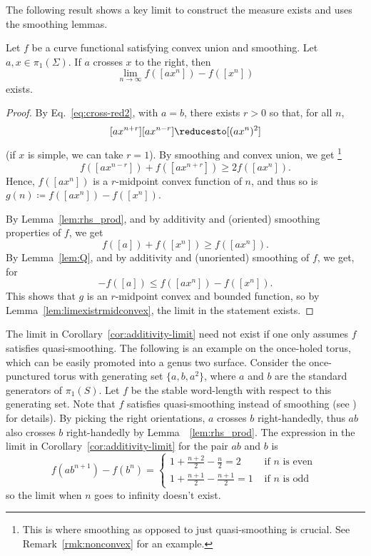 

The following result shows a key limit to construct the measure exists and uses the smoothing lemmas.

\begin{corollary}\label{cor:additivity-limit}
Let $f$ be a curve functional satisfying convex union and smoothing. Let $a,x \in \pi_1(\Sigma)$.
  If $a$ crosses $x$ to the right, then
  \[
    \lim_{n \to \infty} f([a x^n]) - f([x^n])
  \]
  exists.
\end{corollary}

\begin{proof}
  By Eq.~\eqref{eq:cross-red2}, with $a=b$, there exists $r>0$ so that, for all $n$,
  \[
     [ax^{n+r}] [ax^{n-r}] \reducesto [(ax^n)^2]
  \]
  (if $x$ is simple, we can take $r=1$).
  By smoothing and convex union, we get%
  \footnote{This is where smoothing as opposed to just
    quasi-smoothing is crucial. See Remark~\ref{rmk:nonconvex} for an example.}
  \[
  f([ax^{n-r}]) + f([ax^{n+r}]) \geq 2 f([ax^n]).
  \]
  Hence, $f([a x^n])$ is a $r$-midpoint convex function
  of $n$, and thus so is $g(n) \coloneqq f([a x^n]) - f([x^n])$.
 
 By Lemma~\ref{lem:rhs_prod}, and by additivity and (oriented)
 smoothing properties of $f$, we get
 \[
 f([a]) + f([x^{n}]) \geq f([ax^{n}]).
 \]
By Lemma~\ref{lem:Q}, and by additivity and (unoriented) smoothing of $f$, we get, for
  \[
    -f([a]) \le f([a x^n]) - f([x^n]).
  \]
  This shows that $g$ is an $r$-midpoint convex and bounded function, so by Lemma~\ref{lem:limexistrmidconvex}, the limit in the statement exists.
\end{proof}

\begin{remark}
The limit in Corollary~\ref{cor:additivity-limit} need not exist if one only assumes $f$ satisfies quasi-smoothing.
The following is an example on the once-holed torus, which can be easily promoted into a genus two surface.
Consider the once-punctured torus with generating set $\{a,b,a^2\}$, where $a$ and $b$ are the standard generators of $\pi_1(S)$.
Let $f$ be the stable word-length with respect to this generating set. Note that $f$ satisfies quasi-smoothing instead of smoothing (see \cite[Example~4.10]{MGT21:Smoothings}) for details).
By picking the right orientations, $a$ crosses $b$ right-handedly, thus $ab$ also crosses $b$ right-handedly by Lemma~~\ref{lem:rhs_prod}.
The expression in the limit in Corollary~\ref{cor:additivity-limit} for the pair $ab$ and $b$ is
\begin{equation*}
  f(ab^{n+1})-f(b^n)=\begin{cases} 1+ \frac{n+2}{2} - \frac{n}{2}=2& \mbox{ if } n \mbox{ is even } \\
    1+ \frac{n+1}{2} - \frac{n+1}{2}=1 & \mbox{ if } n \mbox{ is odd }
  \end{cases}
\end{equation*}
so the limit when $n$ goes to infinity doesn't exist.
\label{rmk:nonconvex}
\end{remark}

